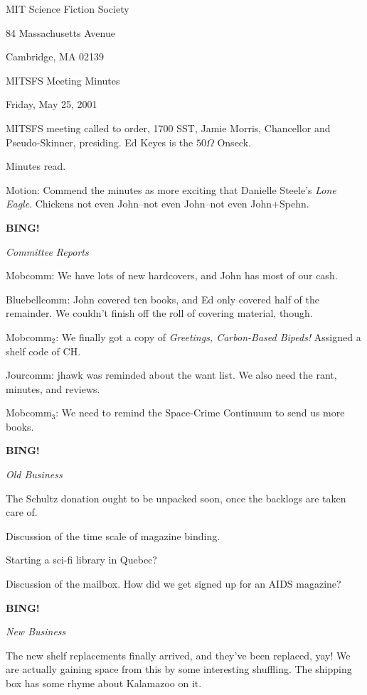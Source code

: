 \documentclass[12pt]{article}
\newcommand{\bing}{{\bf BING!} }
\newcommand{\goto}[1]{\bing \vskip 12pt \centerline{{\em{#1}}}}
\begin{document}
\begin{center}

MIT Science Fiction Society 

84 Massachusetts Avenue

Cambridge, MA 02139

\vspace{12pt}

MITSFS Meeting Minutes 

Friday, May 25, 2001

\end{center}
 
\vspace{18pt}

\setlength{\parskip}{6pt}

\noindent
MITSFS meeting called to order, 1700 SST, Jamie Morris, Chancellor and
Pseudo-Skinner, presiding.  Ed Keyes is the $50 \Omega$ Onseck.

Minutes read.

Motion: Commend the minutes as more exciting that Danielle Steele's
{\em Lone Eagle}.  Chickens not even John--not even John--not even
John+Spehn.

\goto{Committee Reports}

Mobcomm: We have lots of new hardcovers, and John has most of our cash.

Bluebellcomm: John covered ten books, and Ed only covered half of the
remainder.  We couldn't finish off the roll of covering material,
though.

Mobcomm$_2$: We finally got a copy of {\em Greetings, Carbon-Based Bipeds!}
Assigned a shelf code of CH.

Jourcomm: jhawk was reminded about the want list.  We also need the
rant, minutes, and reviews.

Mobcomm$_3$: We need to remind the Space-Crime Continuum to send us
more books.

\goto{Old Business}

The Schultz donation ought to be unpacked soon, once the backlogs are
taken care of.

Discussion of the time scale of magazine binding.

Starting a sci-fi library in Quebec?

Discussion of the mailbox.  How did we get signed up for an AIDS
magazine?

\goto{New Business}

The new shelf replacements finally arrived, and they've been replaced,
yay!  We are actually gaining space from this by some interesting
shuffling.  The shipping box has some rhyme about Kalamazoo on it.
\end{document}
